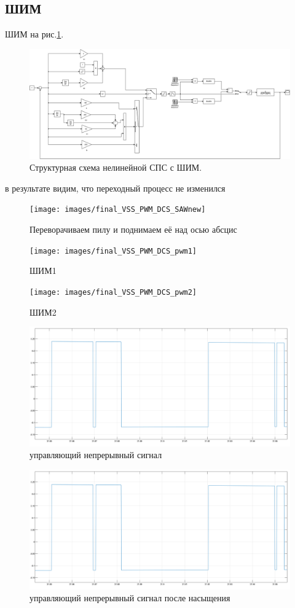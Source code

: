 \clearpage
\subsection{ШИМ}
ШИМ на  рис.\ref{fig:sim_final_VSS_PWM}. 
\begin{figure}[!h]\centering
\includegraphics[width=1.0\linewidth]{images/sim_final_VSS_PWM}
\caption{Структурная схема нелинейной СПС с ШИМ. }\label{fig:sim_final_VSS_PWM}
\end{figure}

в результате видим, что переходный процесс не изменился
\begin{figure}[!h]\centering
\texttt{[image: images/final\_VSS\_PWM\_DCS\_SAWnew]}
\caption{ Переворачиваем пилу  и поднимаем её над осью абсцис}\label{fig:final_VSS_PWM_DCS_SAWnew}
\end{figure}
\begin{figure}[!h]\centering
\texttt{[image: images/final\_VSS\_PWM\_DCS\_pwm1]}
\caption{ ШИМ1}\label{fig:final_VSS_PWM_DCS_pwm1}
\end{figure}
\begin{figure}[!h]\centering
\texttt{[image: images/final\_VSS\_PWM\_DCS\_pwm2]}
\caption{ ШИМ2}\label{fig:final_VSS_PWM_DCS_pwm2}
\end{figure}
\begin{figure}[!h]\centering
\includegraphics[width=0.6\linewidth]{images/final_VSS_PWM_DCS_upr}
\caption{ управляющий непрерывный сигнал }\label{fig:final_VSS_PWM_DCS_upr}
\end{figure}
\begin{figure}[!h]\centering
\includegraphics[width=0.6\linewidth]{images/final_VSS_PWM_DCS_upr_ogr}
\caption{ управляющий непрерывный сигнал после насыщения}\label{fig:final_VSS_PWM_DCS_upr_ogr}
\end{figure}

